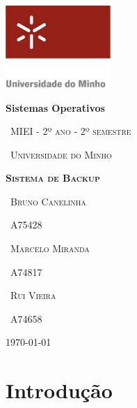 \documentclass[12pt,a4paper]{report}
\begin{document}
\begin{titlepage}
	\centering
	\includegraphics[width=0.3\textwidth]{uminho.jpg}\par\vspace{1cm}
	{\huge\bfseries Sistemas Operativos \par}
	\vspace{0.5cm}
	{\scshape\ MIEI - 2º ano - 2º semestre\par}
	\vspace{0.1cm}
	{\scshape\ Universidade do Minho\par}
	\vspace{1.5cm}
    {\scshape\Huge\bfseries Sistema de Backup \par}
	\vspace{5cm}
    \vspace{1cm}
	{\scshape\ Bruno Canelinha \par} 	\vspace{0.1cm}
	{\scshape\ A75428 \par}  \vspace{0.3cm}
	{\scshape\ Marcelo Miranda \par} \vspace{0.1cm}
	{\scshape\ A74817 \par}  \vspace{0.3cm}
	{\scshape\ Rui Vieira \par} \vspace{0.1cm}
	{\scshape\ A74658 \par}  \vspace{0.3cm}

	\vfill
	{\large \today\par}
\end{titlepage}

\tableofcontents

\chapter{Introdução}
\end{document}

